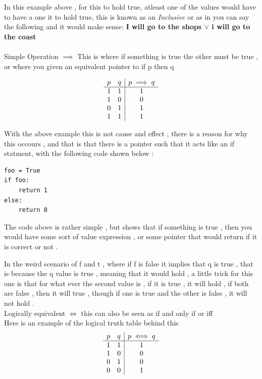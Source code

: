 \documentclass{article}
\theoremstyle{mytheoremstyle}
\theoremstyle{mytheoremstyle}
\theoremstyle{myproblemstyle}
\begin{document}
In this example above , for this to hold true, atleast one of the values would have to have a one it to hold true, this is known as an \textit{Inclusive} or as in you can say the following and it would make sense:
\textbf{I will go to the shops $\lor$ i will go to the coast}\\

\\

Simple Operation $\implies$
This is where if something is true the other must be true , or where you given an equivalent pointer to if p then q


\[\begin{array}{ c c | c }
    p & q & p \implies q \\
    \hline
    1 & 1 & 1 \\
    1 & 0 & 0 \\
    0 & 1 & 1 \\
    1 & 1 & 1 \\
\end{array}\]


With the above example this is not cause and effect , there is a reason for why this occours , and that is that there is a pointer such that it acts like an if statment, with the following code shown below :

\begin{lstlisting}
foo = True
if foo:
    return 1
else:
    return 0
\end{lstlisting}

The code above is rather simple , but shows that if something is true , then you would have some sort of value expression , or some pointer that would return if it is correct or not .

In the weird scenario of f and t , where if f is false it implies that q is true , that is because  the q value is true , meaning that it would hold , a little trick for this one is that for what ever the second value is , if it is true , it will hold , if both are false , then it will true , though if one is true and the other is false , it will not hold .\\

Logically equivalent $\iff$ this can also be seen as if and only if or iff \\
Here is an example of the logical truth table behind this
\[\begin{array}{c c | c }
    p & q & p \iff q \\
    \hline
    1 & 1 & 1 \\
    1 & 0 & 0 \\
    0 & 1 & 0 \\
    0 & 0 & 1 \\
\end{array}\]
\end{document}
